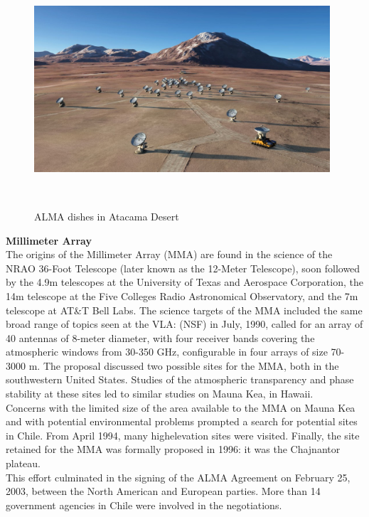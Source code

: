 \begin{figure}[H]
\centering
\includegraphics[width=11cm,height=8cm]{images/alma.jpg}\\
\caption{ALMA dishes in Atacama Desert}
\end{figure}


\textbf{Millimeter Array} \\

The origins of the Millimeter Array (MMA) are found in the science of the NRAO 36-Foot Telescope (later known as the 12-Meter Telescope), soon followed by the 4.9m telescopes at the University of Texas and Aerospace Corporation, the 14m telescope at the Five Colleges Radio Astronomical Observatory, and the 7m telescope at AT\&T Bell Labs. The science targets of the MMA included the same broad range of topics seen at the VLA: (NSF) in July, 1990, called for an array of 40 antennas of 8-meter diameter, with four receiver bands covering the atmospheric windows from 30-350 GHz, configurable in four arrays of size 70-3000 m. The proposal discussed two possible sites for the MMA, both in the southwestern United States. Studies of the atmospheric transparency and phase stability at these sites led to similar studies on Mauna Kea, in Hawaii.\\

Concerns with the limited size of the area available to the MMA on Mauna Kea and with potential environmental problems prompted a search for potential sites in Chile. From April 1994, many highelevation sites were visited. Finally, the site retained for the MMA was formally proposed in 1996: it was the Chajnantor plateau. \\

This effort culminated in the signing of the ALMA Agreement on February 25, 2003, between the North American and European parties. More than 14 government agencies in Chile were involved in the negotiations.\\

